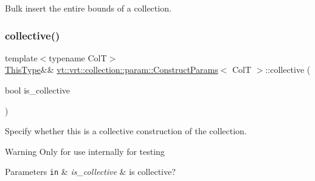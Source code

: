 Bulk insert the entire bounds of a collection. 

\mbox{\label{structvt_1_1vrt_1_1collection_1_1param_1_1_construct_params_aded96b7d8b93f3ae8b91c419cbce6ddd}} 
\subsubsection{\texorpdfstring{collective()}{collective()}}
{\footnotesize\ttfamily template$<$typename ColT$>$ \\
\hyperlink{structvt_1_1vrt_1_1collection_1_1param_1_1_construct_params_a13d4910c0f6825c7b0ddfebce5288bea}{This\+Type}\&\& \hyperlink{structvt_1_1vrt_1_1collection_1_1param_1_1_construct_params}{vt\+::vrt\+::collection\+::param\+::\+Construct\+Params}$<$ ColT $>$\+::collective (\begin{DoxyParamCaption}\item[{bool}]{is\+\_\+collective }\end{DoxyParamCaption})\hspace{0.3cm}{\ttfamily [inline]}}



Specify whether this is a collective construction of the collection. 

\begin{DoxyWarning}{Warning}
Only for use internally for testing
\end{DoxyWarning}

\begin{DoxyParams}[1]{Parameters}
\mbox{\tt in}  & {\em is\+\_\+collective} & is collective? \\
\hline
\end{DoxyParams}
\mbox{\label{structvt_1_1vrt_1_1collection_1_1param_1_1_construct_params_ae74cccae180eb7f0aedf0650396fb8cc}} 
